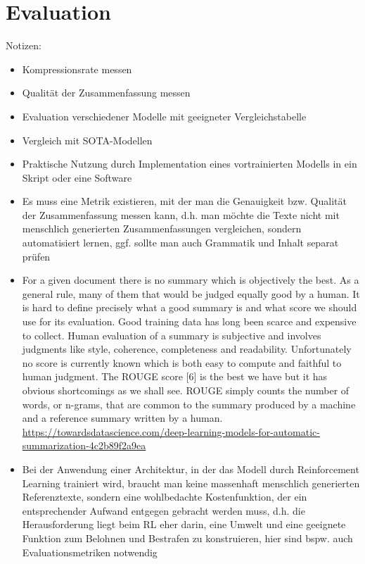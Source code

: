 \section{Evaluation}
Notizen:
\begin{itemize}
	\item Kompressionsrate messen
	\item Qualität der Zusammenfassung messen
	\item Evaluation verschiedener Modelle mit geeigneter Vergleichstabelle
	\item Vergleich mit SOTA-Modellen
	\item Praktische Nutzung durch Implementation eines vortrainierten Modells in ein Skript oder eine Software
	\item Es muss eine Metrik existieren, mit der man die Genauigkeit bzw. Qualität der Zusammenfassung messen kann, d.h. man möchte die Texte nicht mit menschlich generierten Zusammenfassungen vergleichen, sondern automatisiert lernen, ggf. sollte man auch Grammatik und Inhalt separat prüfen
	\item For a given document there is no summary which is objectively the best. As a general rule, many of them that would be judged equally good by a human. It is hard to define precisely what a good summary is and what score we should use for its evaluation. Good training data has long been scarce and expensive to collect. Human evaluation of a summary is subjective and involves judgments like style, coherence, completeness and readability. Unfortunately no score is currently known which is both easy to compute and faithful to human judgment. The ROUGE score [6] is the best we have but it has obvious shortcomings as we shall see. ROUGE simply counts the number of words, or n-grams, that are common to the summary produced by a machine and a reference summary written by a human. \url{https://towardsdatascience.com/deep-learning-models-for-automatic-summarization-4c2b89f2a9ea}
	\item Bei der Anwendung einer Architektur, in der das Modell durch Reinforcement Learning trainiert wird, braucht man keine massenhaft menschlich generierten Referenztexte, sondern eine wohlbedachte Kostenfunktion, der ein entsprechender Aufwand entgegen gebracht werden muss, d.h. die Herausforderung liegt beim RL eher darin, eine Umwelt und eine geeignete Funktion zum Belohnen und Bestrafen zu konstruieren, hier sind bspw. auch Evaluationsmetriken notwendig
\end{itemize}

